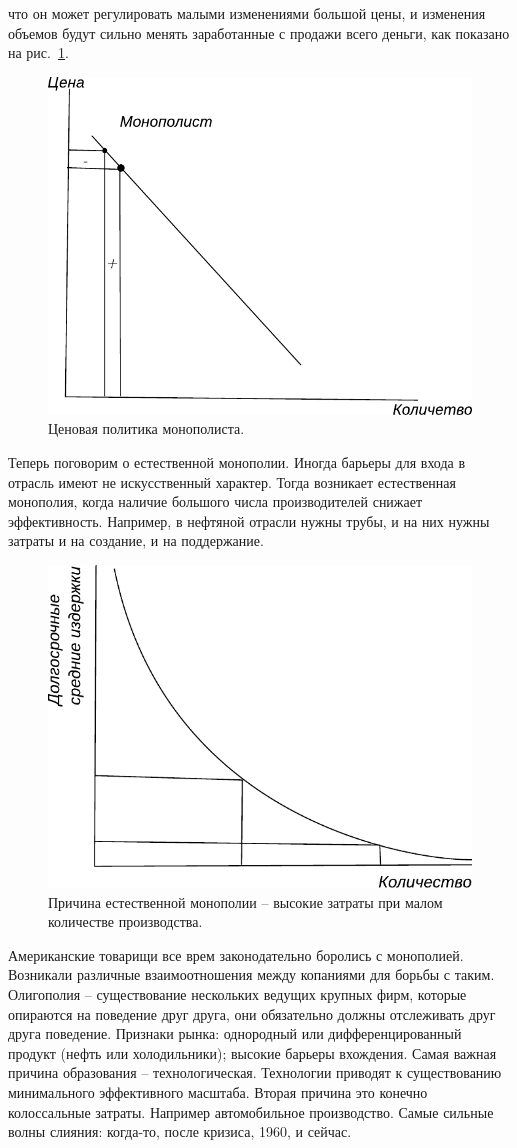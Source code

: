 \documentclass[a4paper, 12pt]{article}
\begin{document}
что он может регулировать малыми изменениями большой цены, и изменения объемов будут сильно менять заработанные с продажи всего деньги, как показано на рис.~\ref{fig:price-quantity}.

\begin{figure}
\includegraphics[width=.5\linewidth]{figures/price-quantity}
\caption{Ценовая политика монополиста.}
\label{fig:price-quantity}
\end{figure}

Теперь поговорим о естественной монополии. Иногда барьеры для входа в отрасль имеют не искусственный характер. Тогда возникает естественная монополия, когда наличие большого числа производителей снижает эффективность. Например, в нефтяной отрасли нужны трубы, и на них нужны затраты и на создание, и на поддержание. 

\begin{figure}
\includegraphics[width=.5\linewidth]{figures/natural-monopoly}
\caption{Причина естественной монополии -- высокие затраты при малом количестве производства.}
\label{fig:natural-monopoly}
\end{figure}

Американские товарищи все врем законодательно боролись с монополией. Возникали различные взаимоотношения между копаниями для борьбы с таким. Олигополия -- существование нескольких ведущих крупных фирм, которые опираются на поведение друг друга, они обязательно должны отслеживать друг друга поведение. Признаки рынка: однородный или дифференцированный продукт (нефть или холодильники); высокие барьеры вхождения. Самая важная причина образования -- технологическая. Технологии приводят к существованию минимального эффективного масштаба. Вторая причина это конечно колоссальные затраты. Например автомобильное производство. Самые сильные волны слияния: когда-то, после кризиса, 1960, и сейчас. 
\end{document}
